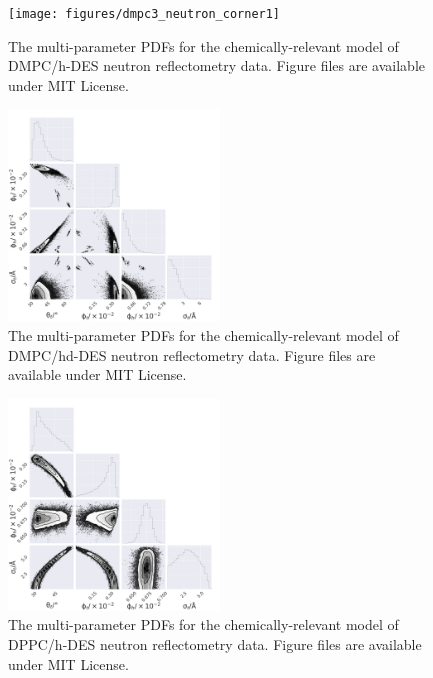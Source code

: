 \documentclass[11pt,a4paper]{article}
\begin{document}
\begin{figure}[h]
	\centering
	\texttt{[image: figures/dmpc3\_neutron\_corner1]}
	\caption{The multi-parameter PDFs for the chemically-relevant model of DMPC/h-DES neutron reflectometry data. Figure files are available under MIT License.\cite{mccluskey_2018}}
	\label{fig:dmpc3_1}
\end{figure}
\begin{figure}
	\centering
	\includegraphics[width=0.50\textwidth]{figures/dmpc3_neutron_corner2}
	\caption{The multi-parameter PDFs for the chemically-relevant model of DMPC/hd-DES neutron reflectometry data. Figure files are available under MIT License.\cite{mccluskey_2018}}
	\label{fig:dmpc3_2}
\end{figure}
\begin{figure}
	\centering
	\includegraphics[width=0.50\textwidth]{figures/dppc3_neutron_corner1}
	\caption{The multi-parameter PDFs for the chemically-relevant model of DPPC/h-DES neutron reflectometry data. Figure files are available under MIT License.\cite{mccluskey_2018}}
	\label{fig:dppc3_1}
\end{figure}
\end{document}

